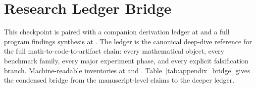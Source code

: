 \documentclass[conference]{IEEEtran}
\begin{document}
\section{Research Ledger Bridge}
This checkpoint is paired with a companion derivation ledger at  and a full program findings synthesis at . The ledger is the canonical deep-dive reference for the full math-to-code-to-artifact chain: every mathematical object, every benchmark family, every major experiment phase, and every explicit falsification branch. Machine-readable inventories at  and . Table~\ref{tab:appendix_bridge} gives the condensed bridge from the manuscript-level claims to the deeper ledger.

\begin{table}[t]
    \centering
    \caption{Appendix bridge from the checkpoint manuscript to the full derivation ledger.}
    \label{tab:appendix_bridge}
    \resizebox{\columnwidth}{!}{}
\end{table}
\end{document}
